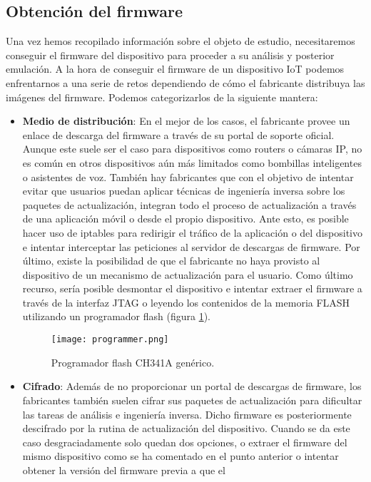 \subsection{Obtención del firmware}
Una vez hemos recopilado información sobre el objeto de estudio, necesitaremos conseguir el firmware del dispositivo para proceder a su análisis y posterior 
emulación. A la hora de conseguir el firmware de un dispositivo IoT podemos enfrentarnos a una serie de retos dependiendo de cómo el fabricante distribuya
las imágenes del firmware. Podemos categorizarlos de la siguiente mantera:
\begin{itemize}
    \item \textbf{Medio de distribución}: En el mejor de los casos, el fabricante provee un enlace de descarga del firmware a través de su portal de soporte oficial. Aunque
    este suele ser el caso para dispositivos como routers o cámaras IP, no es común en otros dispositivos aún más limitados como bombillas inteligentes o asistentes de voz.
    También hay fabricantes que con el objetivo de intentar evitar que usuarios puedan aplicar técnicas de ingeniería inversa sobre los paquetes de actualización, integran 
    todo el proceso de actualización a través de una aplicación móvil o desde el propio dispositivo. Ante esto, es posible hacer uso de iptables para redirigir el tráfico
    de la aplicación o del dispositivo e intentar interceptar las peticiones al servidor de descargas de firmware. Por último, existe la posibilidad de que el fabricante no 
    haya provisto al dispositivo de un mecanismo de actualización para el usuario. Como último recurso, sería posible desmontar el dispositivo e intentar extraer el firmware 
    a través de la interfaz JTAG o leyendo los contenidos de la memoria FLASH utilizando un programador flash (figura \ref{fig:programador}).
    \begin{figure}[H]
        \centering
        \texttt{[image: programmer.png]}
        \caption{Programador flash CH341A genérico.}
        \label{fig:programador}
    \end{figure}
    \item \textbf{Cifrado}: Además de no proporcionar un portal de descargas de firmware, los fabricantes también suelen cifrar sus paquetes de actualización para dificultar las 
    tareas de análisis e ingeniería inversa. Dicho firmware es posteriormente descifrado por la rutina de actualización del dispositivo. Cuando se da este caso desgraciadamente 
    solo quedan dos opciones, o extraer el firmware del mismo dispositivo como se ha comentado en el punto anterior o intentar obtener la versión del firmware previa a que el 

\end{itemize}
